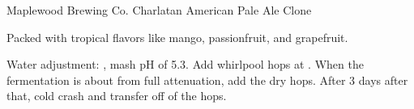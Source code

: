 \begin{recipe}{Maplewood Brewing Co. Charlatan American Pale Ale Clone} %

\begin{aboutblock}
Packed with tropical flavors like mango, passionfruit, and grapefruit. \sourceaha
\end{aboutblock}


\begin{methodandtiming}
 
\begin{mashsteps}
\end{mashsteps}

\begin{directions}
Water adjustment: , mash pH of
5.3. Add whirlpool hops at . When the fermentation is about
 from full attenuation, add the dry hops. After 3 days after that,
cold crash and transfer off of the hops.
\end{directions}

\end{methodandtiming}

\recipebreak

\begin{ingredientsblock}

\begin{malts}
\end{malts}

\begin{hops}
\end{hops}


\end{ingredientsblock}

\end{recipe}

